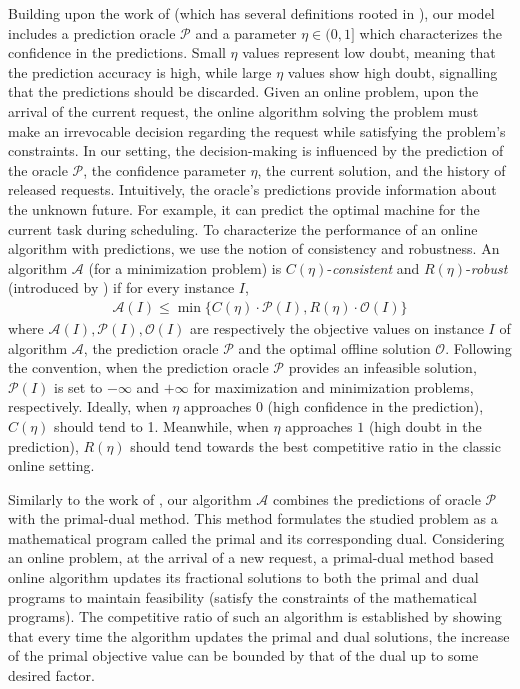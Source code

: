 Building upon the work of \cite{BamasMaggiori20:The-Primal-Dual-method} (which has several definitions rooted in \cite{LykourisVassilvtiskii18:Competitive-caching,KumarPurohit18:Improving-online}), our model includes a prediction oracle $\mathcal{P}$ and a parameter $\eta \in (0,1]$ which characterizes the confidence in the predictions. Small $\eta$ values represent low doubt, meaning that the prediction accuracy is high, while large $\eta$ values show high doubt, signalling that the predictions should be discarded. Given an online problem, upon the arrival of the current request, the online algorithm solving the problem must make an irrevocable decision regarding the request while satisfying the problem's constraints. In our setting, the decision-making is influenced by the prediction of the oracle $\mathcal{P}$, the confidence parameter $\eta$, the current solution, and the history of released requests. Intuitively, the oracle's predictions provide information about the unknown future. For example, it can predict the optimal machine for the current task during scheduling. To characterize the performance of an online algorithm with predictions, we use the notion of consistency and robustness. An algorithm $\mathcal{A}$ (for a minimization problem) is $C(\eta)$-\emph{consistent} and $R(\eta)$-\emph{robust} (introduced by \cite{KumarPurohit18:Improving-online}) if for every instance $I$,
%
\begin{align*}
    \mathcal{A}(I) 	\leq 	\min\{C(\eta) \cdot \mathcal{P}(I), R(\eta) \cdot \mathcal{O}(I) \}  %
\end{align*}
%
where $\mathcal{A}(I), \mathcal{P}(I), \mathcal{O}(I)$ are respectively the objective values on instance $I$ of algorithm $\mathcal{A}$, the prediction oracle $\mathcal{P}$ and the optimal offline solution $\mathcal{O}$. Following the convention, when the prediction oracle $\mathcal{P}$ provides an infeasible solution, $\mathcal{P}(I)$ is set to $-\infty$ and $+\infty$ for maximization and minimization problems, respectively. Ideally, when $\eta$ approaches $0$ (high confidence in the prediction), $C(\eta)$ should tend to 1. Meanwhile, when $\eta$ approaches $1$ (high doubt in the prediction), $R(\eta)$ should tend towards the best competitive ratio in the classic online setting.

Similarly to the work of \cite{BamasMaggiori20:The-Primal-Dual-method}, our algorithm $\mathcal{A}$ combines the predictions of oracle $\mathcal{P}$ with the primal-dual method. This method formulates the studied problem as a mathematical program called the primal and its corresponding dual. Considering an online problem, at the arrival of a new request, a primal-dual method based online algorithm updates its fractional solutions to both the primal and dual programs to maintain feasibility (satisfy the constraints of the mathematical programs). The competitive ratio of such an algorithm is established by showing that every time the algorithm updates the primal and dual solutions, the increase of the primal objective value can be bounded by that of the dual up to some desired factor.

